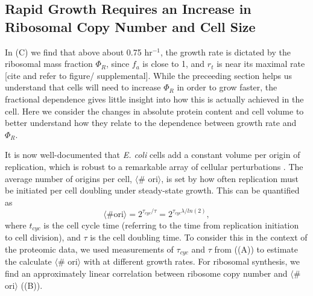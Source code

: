 \subsection{Rapid Growth Requires an Increase in Ribosomal Copy Number and Cell Size}


In (C) we find that above about  0.75 hr$^{-1}$, the growth
rate is dictated by the ribosomal mass fraction $\Phi_R$, since $f_a$ is close
to 1, and $r_t$ is near its maximal rate [cite and refer to figure/
supplemental]. While the preceeding section helps us understand that cells will
need to increase $\Phi_R$ in order to grow faster, the fractional dependence
gives little insight into how this is actually achieved in the cell. Here we
consider the changes in absolute protein content and cell volume to better
understand how they relate to the dependence between growth rate and $\Phi_R$.

It is now well-documented that \textit{E. coli} cells add a constant volume per
origin of replication, which is robust to a remarkable array of cellular
perturbations \citep{si2017}.  The average number of origins per cell, $\langle$\#
ori$\rangle$, is set by how often replication must be initiated per cell doubling
under steady-state growth. This can be quantified as
\begin{equation}
    \langle \text{\# ori} \rangle = 2^{\tau_{cyc} / \tau} = 2^{\tau_{cyc} \lambda / ln(2)},
    \label{eq:Nori}
\end{equation}
where $t_{cyc}$ is the cell cycle time (referring to the time from replication
initiation to cell division), and $\tau$ is the cell doubling time. To consider
this  in the context of the proteomic data, we used measurements of $\tau_{cyc}$
and  $\tau$ from \cite{si2017} ((A)) to estimate
the calculate $\langle$\# ori$\rangle$  with  at different growth
rates. For ribosomal synthesis, we find an approximately linear correlation
between ribosome copy number and $\langle$\# ori$\rangle$
((B)).

